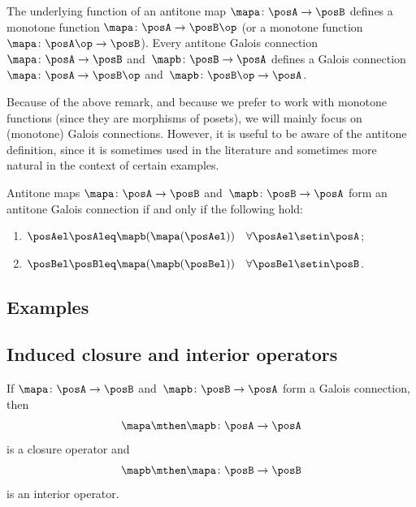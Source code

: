\begin{remark}\label{rem:not-focusing-on-antitone-Galois-connections}
    The underlying function of an antitone map $\mapa\colon \posA\to \posB$ defines a monotone function $\mapa\colon \posA\to \posB\op$ (or a monotone function $\mapa \colon \posA \op \to \posB$).
    Every antitone Galois connection $\mapa \colon \posA \to \posB$ and~$\mapb \colon \posB \to \posA$ defines a Galois connection $\mapa \colon \posA \to \posB\op$ and~$\mapb \colon \posB\op \to \posA$.
\end{remark}

Because of the above remark, and because we prefer to work with monotone functions (since they are morphisms of posets), we will mainly focus on (monotone) Galois connections.
However, it is useful to be aware of the antitone definition, since it is sometimes used in the literature and sometimes more natural in the context of certain examples.

\begin{lemma}\label{lem:alternative-def-antitone-Galois-connection}
    Antitone maps $\mapa\colon \posA\to \posB$ and~$\mapb\colon \posB\to \posA$ form an antitone Galois connection if and only if the following hold:
    \begin{enumerate}
        \item $\posAel\posAleq \mapb(\mapa(\posAel)) \quad \forall \posAel\setin \posA$;
        \item $\posBel\posBleq \mapa(\mapb(\posBel)) \quad \forall \posBel\setin \posB$.
    \end{enumerate}
\end{lemma}

\subsection{Examples}



\subsection{Induced closure and interior operators}

\begin{lemma}\label{lem:closure-interior-operators-from-Galois-connection}
    If $\mapa \colon \posA \to \posB$ and~$\mapb \colon \posB \to \posA$ form a Galois connection, then
    \begin{equation}\label{eq:closure-from-Galois}
        \mapa \mthen \mapb \colon \posA \to \posA
    \end{equation}
    is a closure operator and
    \begin{equation}\label{eq:interior-from-Galois}
        \mapb \mthen \mapa \colon \posB \to \posB
    \end{equation}
    is an interior operator.
\end{lemma}

